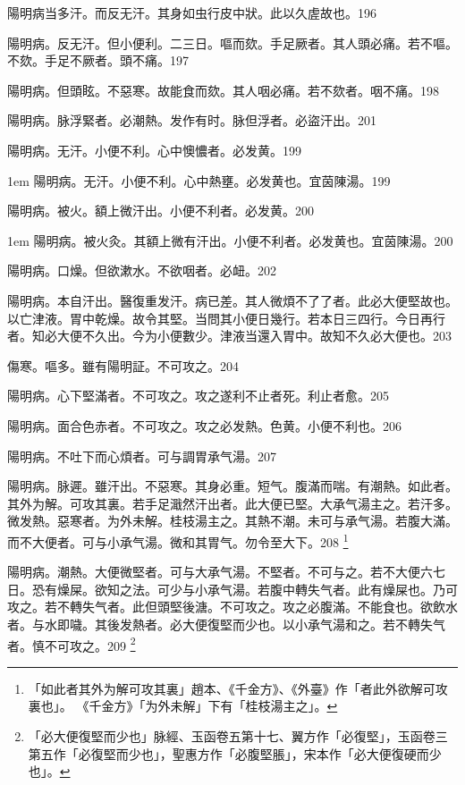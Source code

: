 陽明病当多汗。而反无汗。其身如虫行皮中狀。此以久虗故也。196

陽明病。反无汗。但小便利。二三日。嘔而欬。手足厥者。其人頭必痛。若不嘔。不欬。手足不厥者。頭不痛。197

陽明病。但頭眩。不惡寒。故能食而欬。其人咽必痛。若不欬者。咽不痛。198

陽明病。脉浮緊者。必潮熱。发作有时。{\khaaitp 脉}但浮者。必盜汗出。201

陽明病。无汗。小便不利。心中懊憹者。必发黄。199

\hangindent 1em
陽明病。无汗。小便不利。心中熱壅。必发黄也。宜茵陳湯。{\gaoben}199

陽明病。被火。額上微汗出。小便不利者。必发黄。200

\hangindent 1em
陽明病。被火灸。其額上微有汗出。小便不利者。必发黄也。宜茵陳湯。{\gaoben}200

陽明病。口燥。但欲漱水。不欲咽者。必衄。202

陽明病。本自汗出。醫復重发汗。病已差。其人微煩不了了者。此必大便堅故也。以亡津液。胃中乾燥。故令其堅。当問其小便日幾行。若本日三四行。今日再行者。知必大便不久出。今为小便數少。津液当還入胃中。故知不久必大便也。203

傷寒。嘔多。雖有陽明証。不可攻之。204

陽明病。心下堅滿者。不可攻之。攻之遂利不止者死。利止者愈。205

陽明病。面合色赤者。不可攻之。{\khaaitp 攻之}必发熱。色黄。小便不利也。206

陽明病。不吐下而{\khaaitp 心}煩者。可与{\khaaitp 調胃}承气湯。207

陽明病。脉遲。雖汗出。不惡寒。其身必重。短气。腹滿而喘。有潮熱。如此者。其外为解。可攻其裏。若手足濈然汗出者。此大便已堅。{\khaaitp 大}承气湯主之。若汗多。微发熱。惡寒者。为外未解。{\khaaitp 桂枝湯主之。}其熱不潮。未可与承气湯。若腹大滿。而不大便者。可与小承气湯。微和其胃气。勿令至大下。208
	\footnote{
		「如此者其外为解可攻其裏」趙本、《千金方》、《外臺》作「者此外欲解可攻裏也」。
		《千金方》「为外未解」下有「桂枝湯主之」。
	}

陽明病。潮熱。大便微堅者。可与{\khaaitp 大}承气湯。不堅者。不可与之。若不大便六七日。恐有燥屎。欲知之法。可少与小承气湯。若腹中轉失气者。此有燥屎也。乃可攻之。若不轉失气者。此但頭堅後溏。不可攻之。攻之必腹滿。不能食也。欲飲水者。与水即噦。其後发熱者。必大便復堅而少也。以小承气湯和之。若不轉失气者。慎不可攻之。209
	\footnote{「必大便復堅而少也」脉經、玉函卷五第十七、翼方作「必復堅」，玉函卷三第五作「必復堅而少也」，聖惠方作「必腹堅脹」，宋本作「必大便復硬而少也」。}

